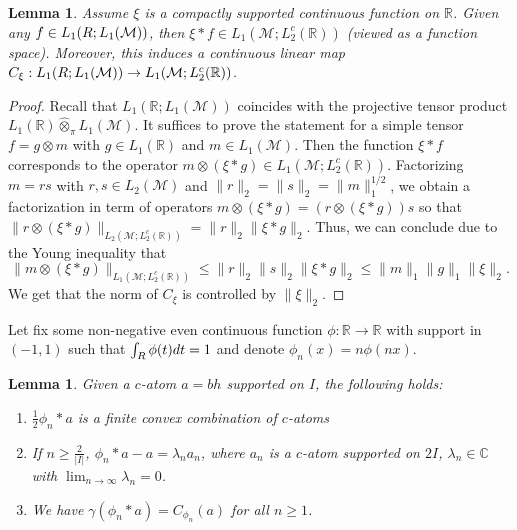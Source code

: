 \documentclass[psamsfonts]{amsart}
\newtheorem{lemma}[theorem]{Lemma}
\newcommand{\R}{\mathbb{R}}
\newcommand{\C}{\mathbb{C}}
\newcommand{\Lone}{L_1}
\newcommand{\Ltwo}{L_2}
\newcommand{\Ltwoc}{L_2^c}
\begin{document}
\begin{lemma}\label{lem:conv}
  Assume $\xi$ is a compactly supported continuous function on $\R$. Given any $f\in \Lone(\mathbb \R; \Lone(\mathcal M))$, then $\xi*f\in\Lone(\mathcal M;\Ltwoc(\mathbb R))$ (viewed as a function
  space). Moreover, this induces a continuous linear map
  $C_\xi : \Lone(\mathbb \R; \Lone(\mathcal M))\to\Lone(\mathcal
  M;\Ltwoc(\mathbb R))$.
      \end{lemma}
      \begin{proof}
        Recall that $\Lone(\mathbb R; \Lone(\mathcal M))$ coincides with the projective tensor product $\Lone(\R) \widehat \otimes_\pi \Lone(\mathcal M)$. It suffices to prove the statement for a simple tensor
        $f=g \otimes m$ with $g\in\Lone(\R)$ and
        $m\in \Lone (\mathcal M)$. Then the function $\xi*f$
        corresponds to the operator
        $m\otimes (\xi*g)\in \Lone(\mathcal M;\Ltwoc(\mathbb
        R))$. Factorizing $m=rs$ with $r,s\in \Ltwo(\mathcal M)$ and
        $\|r\|_2=\|s\|_2=\|m\|_1^{1/2}$, we obtain a factorization in
        term of operators $m\otimes (\xi*g)= (r \otimes (\xi*g))s$
        so that $\|r \otimes (\xi*g)\|_{ \Ltwo(\mathcal M;\Ltwoc(\mathbb
        R))}=\|r\|_2 \|\xi*g\|_2$. Thus, we can conclude due to the Young inequality that
        $$\|m\otimes (\xi*g)\|_{ \Lone(\mathcal M;\Ltwoc(\mathbb
        R))}\leq \|r\|_2\|s\|_2\|\xi*g\|_2\leq \|m\|_1 \|g\|_1 \|\xi\|_2.$$
      We get that the norm of $C_\xi$ is controlled by $\|\xi\|_2$.
      \end{proof}
    Let fix some non-negative even continuous function $\phi:\mathbb R\to \R$ with support in $(-1,1)$ such that $\int_{\mathbb \R}\phi(t)dt =1$ and denote $\phi_n(x)=n\phi(nx)$.       
\begin{lemma}\label{lem:convolutionAtoms}
        Given a $c$-atom $a=bh$ supported on $I$, the following holds:
        \begin{enumerate}
        \item   $\frac 12\phi_n*a$ is a finite convex combination of $c$-atoms
        \item If $n\geq \frac 2{|I|}$, $\phi_n* a - a= \lambda_n a_n$,
          where $a_n$ is a $c$-atom supported on $2I$,  $\lambda_n\in \C$ with
          $\lim_{n\to \infty} \lambda_n=0$.
        \item We have $\gamma(\phi_n*a)=C_{\phi_n}(a)$ for all $n\geq 1$.
                  \end{enumerate}
      \end{lemma}
\end{document}
